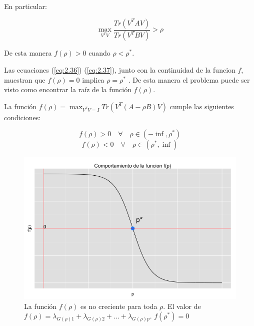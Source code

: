 En particular:

\begin{equation*}
\max_{V^TV} \frac{Tr(V^{T} A V)}{Tr(V^{T} B V)} > \rho
\end{equation*}

De esta manera $f(\rho) > 0$ cuando $\rho < \rho^*$.


Las ecuaciones (\ref{eq:2.36}) (\ref{eq:2.37}), junto con la continuidad de la funcion $f$, muestran que $f(\rho) = 0$ implica $\rho = \rho^*$ \cite{ngo2012trace}. De esta manera el problema puede ser visto como encontrar la raíz de la función $f(\rho)$.

\begin{corollary}
La función $f(\rho) = \max_{V^TV = I} Tr(V^T (A -\rho B)V)$ cumple las siguientes condiciones:

$$f(\rho) > 0  \quad \forall \quad \rho \in (-\inf, \rho^*)$$
$$f(\rho) < 0  \quad \forall \quad \rho \in (\rho^*, \inf)$$

\end{corollary}

\begin{figure}[!ht]
  \centering
	\includegraphics[width=1\textwidth]{Figures/Chapter2_fp}	
  \caption[Comportamiento de $f(\rho)$]
  {La función $f(\rho)$ es no creciente para toda $\rho$. El valor de $f(\rho) = \lambda_{G(\rho)1}+ \lambda_{G(\rho)2} + ... +\lambda_{G(\rho)p}.$ $f(\rho^*) = 0 $}
\end{figure}


